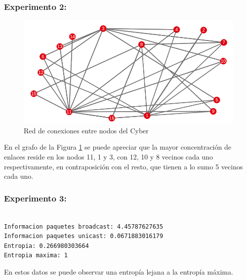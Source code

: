 \subsubsection{Experimento 2:}

\begin{figure}[H]
  \centering
    \includegraphics[scale=0.75]{imagenes/graficos/grafos/cyber.png}
  \caption{Red de conexiones entre nodos del Cyber}
  \label{fig:19}
\end{figure}

En el grafo de la Figura \ref{fig:19} se puede apreciar que la mayor concentración de enlaces reside en los nodos 11, 1 y 3, con 12, 10 y 8 vecinos cada uno respectivamente, en contraposición con el resto, que tienen a lo sumo 5 vecinos cada uno.

\subsubsection{Experimento 3:}

\begin{verbatim}

Informacion paquetes broadcast: 4.45787627635
Informacion paquetes unicast: 0.0671883016179
Entropia: 0.266980303664
Entropia maxima: 1

\end{verbatim}

En estos datos se puede observar una entropía lejana a la entropía máxima.